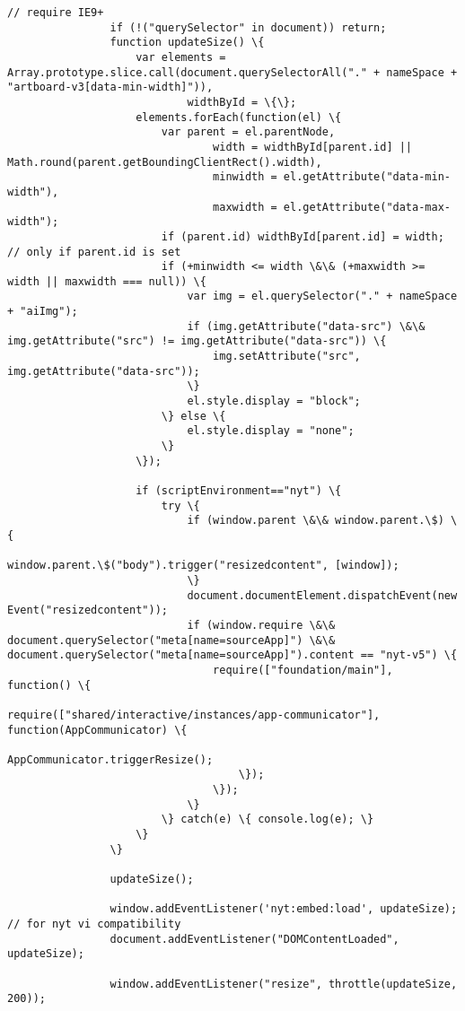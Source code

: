 \documentclass[11pt]{article}
\begin{document}
\begin{Verbatim}[commandchars=\\\{\}]
         		// require IE9+
         		if (!("querySelector" in document)) return;
         		function updateSize() \{
         			var elements = Array.prototype.slice.call(document.querySelectorAll("." + nameSpace + "artboard-v3[data-min-width]")),
         					widthById = \{\};
         			elements.forEach(function(el) \{
         				var parent = el.parentNode,
         						width = widthById[parent.id] || Math.round(parent.getBoundingClientRect().width),
         						minwidth = el.getAttribute("data-min-width"),
         						maxwidth = el.getAttribute("data-max-width");
         				if (parent.id) widthById[parent.id] = width; // only if parent.id is set
         				if (+minwidth <= width \&\& (+maxwidth >= width || maxwidth === null)) \{
         					var img = el.querySelector("." + nameSpace + "aiImg");
         					if (img.getAttribute("data-src") \&\& img.getAttribute("src") != img.getAttribute("data-src")) \{
         						img.setAttribute("src", img.getAttribute("data-src"));
         					\}
         					el.style.display = "block";
         				\} else \{
         					el.style.display = "none";
         				\}
         			\});
         
         			if (scriptEnvironment=="nyt") \{
         				try \{
         					if (window.parent \&\& window.parent.\$) \{
         						window.parent.\$("body").trigger("resizedcontent", [window]);
         					\}
         					document.documentElement.dispatchEvent(new Event("resizedcontent"));
         					if (window.require \&\& document.querySelector("meta[name=sourceApp]") \&\& document.querySelector("meta[name=sourceApp]").content == "nyt-v5") \{
         						require(["foundation/main"], function() \{
         							require(["shared/interactive/instances/app-communicator"], function(AppCommunicator) \{
         								AppCommunicator.triggerResize();
         							\});
         						\});
         					\}
         				\} catch(e) \{ console.log(e); \}
         			\}
         		\}
         
         		updateSize();
         
         		window.addEventListener('nyt:embed:load', updateSize); // for nyt vi compatibility
         		document.addEventListener("DOMContentLoaded", updateSize);
         
         		window.addEventListener("resize", throttle(updateSize, 200));
         

\end{Verbatim}
\end{document}
